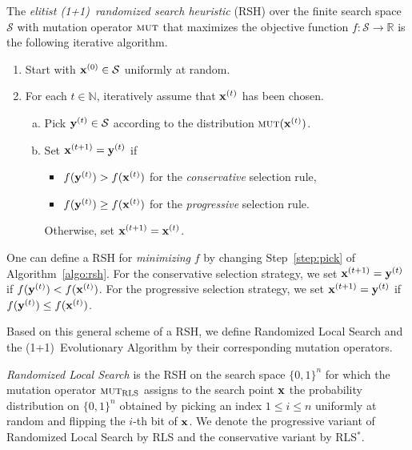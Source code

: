 \documentclass[a4paper,11pt]{article}
\begin{document}
\begin{samepage}
\begin{algorithm}[RSH]\label{algo:rsh}
The \emph{elitist (1+1)~randomized search heuristic} (RSH) over the finite search space~$\mathcal{S}$ with mutation operator $\textsc{mut}$ that maximizes the objective function $f:\mathcal{S}\to\mathbb{R}$ is the following iterative algorithm. 

\begin{enumerate}
 \item Start with $\xvec[0] \in \mathcal{S}$ uniformly at random.
 \item For each $t\in\mathbb{N}$, iteratively assume that $\xvec[t]$ has been chosen.
 \begin{enumerate}[(a)]
 \item \label{step:mutate} Pick $\yvec[t] \in \mathcal{S}$ according to the distribution $\mut(\xvec[t])$.
 \item \label{step:pick} Set $\xvec[t+1] = \yvec[t]$ if
 \begin{itemize}
 \item $f(\yvec[t]) > f(\xvec[t])$ for the \emph{conservative} selection rule,
 \item $f(\yvec[t]) \geq f(\xvec[t])$ for the \emph{progressive} selection rule.
 \end{itemize}
 Otherwise, set $\xvec[t+1] = \xvec[t]$.
 \end{enumerate}
 \end{enumerate}
\end{algorithm}
\end{samepage}

One can define a RSH for \emph{minimizing} $f$ by changing Step~\ref{step:pick} of Algorithm~\ref{algo:rsh}. For the conservative selection strategy, we set $\xvec[t+1] = \yvec[t]$ if $f(\yvec[t])<f(\xvec[t])$. For the progressive selection strategy, we set $\xvec[t+1] = \yvec[t]$ if $f(\yvec[t])\leq f(\xvec[t])$.

Based on this general scheme of a RSH, we define Randomized Local Search and the (1+1)~Evolutionary Algorithm by their corresponding mutation operators.

\begin{algorithm}\label{alg:rls}
\emph{Randomized Local Search} is the RSH on the search space $\{0,1\}^n$ for which the mutation operator $\textsc{mut}_{\mathrm{RLS}}$ assigns to the search point $\xvec$ the probability distribution on $\{0,1\}^n$ obtained by picking an index $1 \leq i \leq n$ uniformly at random and flipping the $i$-th bit of $\xvec$. We denote the progressive variant of Randomized Local Search by RLS and the conservative variant by RLS$^*$.
\end{algorithm}
\end{document}
